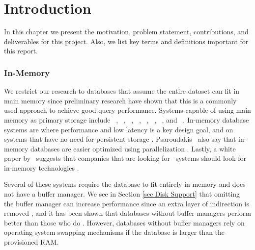 \chapter{Introduction}
\label{chap:introduction}
In this chapter we present the motivation, problem statement, contributions, and deliverables for this project. Also, we list key terms and definitions important for this report.
\clearpage





\subsection{In-Memory}
\label{sub:In-Memory}
We restrict our research to databases that assume the entire dataset can fit in main memory since preliminary research have shown that this is a commonly used approach to achieve good query performance. Systems capable of using main memory as primary storage include \oracle~\cite{Lahiri2015-mz}, \saph~\cite{Farber2012-vh}, \gorilla~\cite{Pelkonen2015-ko}, \qlikview~\cite{Qlik2011-ef}, \tableau~\cite{Kamkolkar2015-iq}, \monetdb~\cite{Boncz2002-yj}, \blink~\cite{Barber2012-xt}, and \sapnw~\cite{Lemke2010-is}. In-memory database systems are where performance and low latency is a key design goal, and on systems that have no need for persistent storage \cite{Zicari2012-is}. Psaroudakis \ea~also say that in-memory databases are easier optimized using parallelization \cite{Psaroudakis2013-fn}. Lastly, a white paper by \qlikview~suggests that companies that are looking for \bi~systems should look for in-memory technologies \cite{Bereanu2010-tj}. 

Several of these systems require the database to fit entirely in memory and does not have a buffer manager. We see in Section \ref{sec:Disk Support} that omitting the buffer manager can increase performance since an extra layer of indirection is removed \cite{Graefe2014-ds}, and it has been shown that databases without buffer managers perform better than those who do \cite{Ferrari2012-hm} . However, databases without buffer managers rely on operating system swapping mechanisms if the database is larger than the provisioned RAM.

